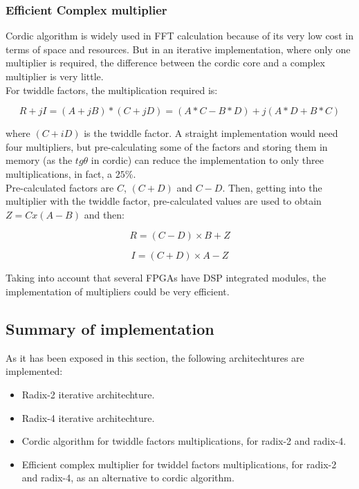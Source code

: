 \documentclass[conference]{IEEEtran}
\begin{document}
\subsubsection{Efficient Complex multiplier}

Cordic algorithm is widely used in FFT calculation because of its very low cost in terms of space and resources. But in an iterative 
implementation, where only one multiplier is required, the difference between the cordic core and a complex multiplier is very little.\\

For twiddle factors, the multiplication required is:

\begin{equation}
R+jI = (A+jB)*(C+jD) = (A*C-B*D) + j(A*D+B*C)
\label{eq:prodcomp4}
\end{equation}

where $(C+iD)$ is the twiddle factor. A straight implementation would need four multipliers, but pre-calculating some of the factors and 
storing them in memory (as the $tg\theta$ in cordic) can reduce the implementation to only three multiplications, in fact, a $25 \%$.\\

Pre-calculated factors are $C$, $(C+D)$ and $C-D$. Then, getting into the multiplier with the twiddle factor, pre-calculated values 
are used to obtain $Z = C x (A-B)$ and then:

\begin{equation}
R = (C-D) \times B + Z
\label{eq:prodcompR}
\end{equation}

\begin{equation}
I = (C+D) \times A - Z
\label{eq:prodcompI}
\end{equation}
 
Taking into account that several FPGAs have DSP integrated modules, the implementation of multipliers could be very efficient.\\

\subsection{Summary of implementation}

As it has been exposed in this section, the following architechtures are implemented:

\begin{itemize}
  \item Radix-2 iterative architechture.
  \item Radix-4 iterative architechture.
  \item Cordic algorithm for twiddle factors multiplications, for radix-2 and radix-4.
  \item Efficient complex multiplier for twiddel factors multiplications, for radix-2 and radix-4, as an alternative to 
  cordic algorithm.
\end{itemize} 
\end{document}
